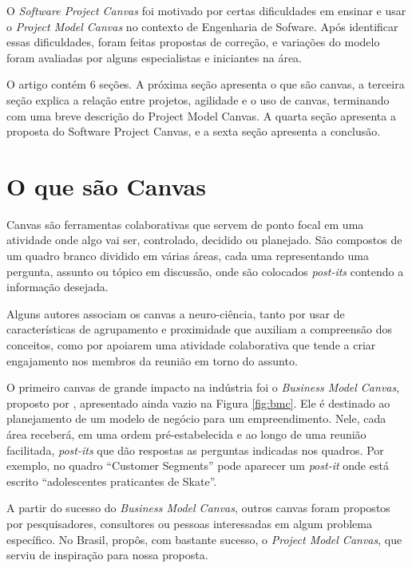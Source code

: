 \documentclass[a4]{report}
\begin{document}
O \textit{Software Project Canvas} foi motivado por certas dificuldades em ensinar e usar o \textit{Project Model Canvas} no contexto de Engenharia de Sofware. Após identificar essas dificuldades, foram feitas propostas de correção, e variações do modelo foram avaliadas por alguns especialistas e iniciantes na área.

O artigo contém 6 seções. A próxima seção apresenta o que são canvas, a terceira seção explica a relação entre projetos, agilidade e o uso de canvas, terminando com uma breve descrição do Project Model Canvas. A quarta seção apresenta a proposta do Software Project Canvas, e a sexta seção apresenta a conclusão.

\section{O que são Canvas}

Canvas são ferramentas colaborativas que servem de ponto focal em uma atividade onde algo vai ser, controlado, decidido ou planejado. São compostos de um quadro branco dividido em várias áreas, cada uma representando uma pergunta, assunto ou tópico em discussão, onde são colocados \textit{post-its} contendo a informação desejada.

Alguns autores\citep{finocchio:2013} associam os canvas a neuro-ciência, tanto por usar de características de agrupamento e proximidade que auxiliam a compreensão dos conceitos, como por apoiarem uma atividade colaborativa que tende a criar engajamento nos membros da reunião em torno do assunto.

O primeiro canvas de grande impacto na indústria foi o \textit{Business Model Canvas}, proposto por \citet{osterwalder2010business}, apresentado ainda vazio na Figura \ref{fig:bmc}. Ele é destinado ao planejamento de um modelo de negócio para um empreendimento. Nele, cada área receberá, em uma ordem pré-estabelecida e ao longo de uma reunião facilitada, \textit{post-its} que dão respostas as perguntas indicadas nos quadros. Por exemplo, no quadro ``Customer Segments'' pode aparecer um \textit{post-it} onde está escrito ``adolescentes praticantes de Skate''.

A partir do sucesso do \textit{Business Model Canvas},  outros canvas foram propostos por pesquisadores, consultores ou pessoas interessadas em algum problema específico. No Brasil, \citeauthor{finocchio:2013} propôs, com bastante sucesso, o \textit{Project Model Canvas}\citep{finocchio:2013}, que serviu de inspiração para nossa proposta.
\end{document}

